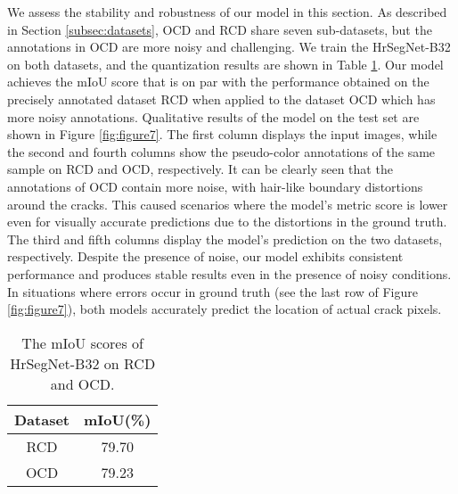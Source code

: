 \documentclass[preprint,12pt,authoryear]{elsarticle}
\begin{document}
We assess the stability and robustness of our model in this section. As described in Section \ref{subsec:datasets}, OCD and RCD share seven sub-datasets, but the annotations in OCD are more noisy and challenging. We train the HrSegNet-B32 on both datasets, and the quantization results are shown in Table \ref{tab:table4}. Our model achieves the mIoU score that is on par with the performance obtained on the precisely annotated dataset RCD when applied to the dataset OCD which has more noisy annotations. Qualitative results of the model on the test set are shown in Figure \ref{fig:figure7}. The first column displays the input images, while the second and fourth columns show the pseudo-color annotations of the same sample on RCD and OCD, respectively. It can be clearly seen that the annotations of OCD contain more noise, with hair-like boundary distortions around the cracks. This caused scenarios where the model's metric score is lower even for visually accurate predictions due to the distortions in the ground truth. The third and fifth columns display the model's prediction on the two datasets, respectively. Despite the presence of noise, our model exhibits consistent performance and produces stable results even in the presence of noisy conditions. In situations where errors occur in ground truth (see the last row of Figure \ref{fig:figure7}), both models accurately predict the location of actual crack pixels.

\begin{center}
    \begin{table}[t]
        \centering
        \begin{tabular}{c|c}
            \toprule
             Dataset & mIoU(\%)  \\
             \hline
             RCD & 79.70\\
             OCD & 79.23\\
            \bottomrule
        \end{tabular}
        \caption{The mIoU scores of HrSegNet-B32 on RCD and OCD.} %
        \label{tab:table4}
    \end{table}
\end{center}
\end{document}

